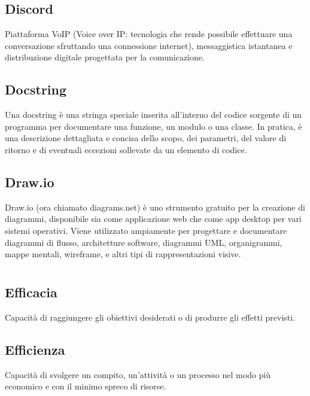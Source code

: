 \subsection*{Discord}
Piattaforma VoIP (Voice over IP: tecnologia che rende possibile effettuare una conversazione sfruttando una connessione internet), messaggistica istantanea 
e distribuzione digitale progettata per la comunicazione.

\hypertarget{sec:docstring}{}
\subsection*{Docstring}
Una docstring è una stringa speciale inserita all'interno del codice sorgente di un programma per documentare una funzione, un modulo 
o una classe. In pratica, è una descrizione dettagliata e concisa dello scopo, dei parametri, del valore di ritorno e di eventuali 
eccezioni sollevate da un elemento di codice.

\subsection*{Draw.io}
Draw.io (ora chiamato diagrams.net) è uno strumento gratuito per la creazione di diagrammi, disponibile sia come applicazione web che come app desktop per 
vari sistemi operativi. Viene utilizzato ampiamente per progettare e documentare diagrammi di flusso, architetture software, diagrammi UML, organigrammi, 
mappe mentali, wireframe, e altri tipi di rappresentazioni visive.

\newpage



\section{}

\hypertarget{sec:efficacia}{}
\subsection*{Efficacia}
Capacità di raggiungere gli obiettivi desiderati o di produrre gli effetti previsti.

\hypertarget{sec:efficienza}{}
\subsection*{Efficienza}
Capacità di svolgere un compito, un'attività o un processo nel modo più economico e con il minimo spreco di risorse.

